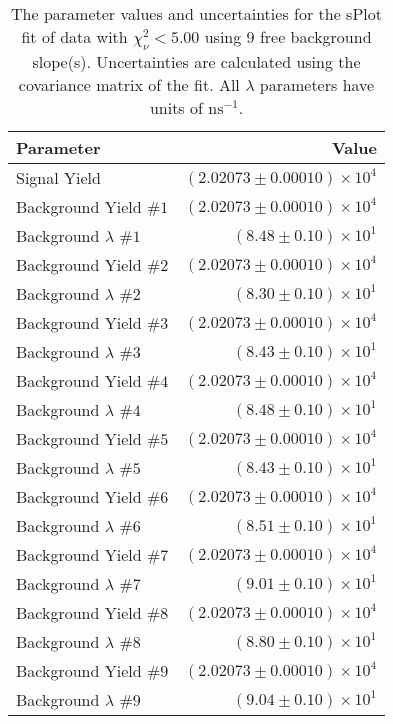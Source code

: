 
\begin{table}
    \begin{center}
        \begin{tabular}{lr}\toprule
            Parameter & Value \\\midrule
            Signal Yield & $(2.02073 \pm 0.00010) \times 10^{4}$ \\
            Background Yield $\#1$ & $(2.02073 \pm 0.00010) \times 10^{4}$ \\
            Background $\lambda$ $\#1$ & $(8.48 \pm 0.10) \times 10^{1}$ \\
            Background Yield $\#2$ & $(2.02073 \pm 0.00010) \times 10^{4}$ \\
            Background $\lambda$ $\#2$ & $(8.30 \pm 0.10) \times 10^{1}$ \\
            Background Yield $\#3$ & $(2.02073 \pm 0.00010) \times 10^{4}$ \\
            Background $\lambda$ $\#3$ & $(8.43 \pm 0.10) \times 10^{1}$ \\
            Background Yield $\#4$ & $(2.02073 \pm 0.00010) \times 10^{4}$ \\
            Background $\lambda$ $\#4$ & $(8.48 \pm 0.10) \times 10^{1}$ \\
            Background Yield $\#5$ & $(2.02073 \pm 0.00010) \times 10^{4}$ \\
            Background $\lambda$ $\#5$ & $(8.43 \pm 0.10) \times 10^{1}$ \\
            Background Yield $\#6$ & $(2.02073 \pm 0.00010) \times 10^{4}$ \\
            Background $\lambda$ $\#6$ & $(8.51 \pm 0.10) \times 10^{1}$ \\
            Background Yield $\#7$ & $(2.02073 \pm 0.00010) \times 10^{4}$ \\
            Background $\lambda$ $\#7$ & $(9.01 \pm 0.10) \times 10^{1}$ \\
            Background Yield $\#8$ & $(2.02073 \pm 0.00010) \times 10^{4}$ \\
            Background $\lambda$ $\#8$ & $(8.80 \pm 0.10) \times 10^{1}$ \\
            Background Yield $\#9$ & $(2.02073 \pm 0.00010) \times 10^{4}$ \\
            Background $\lambda$ $\#9$ & $(9.04 \pm 0.10) \times 10^{1}$ \\\bottomrule
        \end{tabular}
        \caption{The parameter values and uncertainties for the sPlot fit of data with $\chi^2_\nu < 5.00$ using 9 free background slope(s). Uncertainties are calculated using the covariance matrix of the fit. All $\lambda$ parameters have units of $\si{\nano\second}^{-1}$.}
    \end{center}
\end{table}
